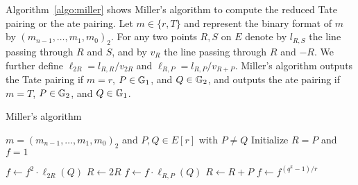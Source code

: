 
Algorithm~\ref{algo:miller} shows Miller's algorithm to compute the reduced Tate pairing or the ate pairing. 
Let $m \in \{r,T\}$ and represent the binary format of $m$ by $(m_{n-1},\dots,m_1,m_0)_2$.
For any two points $R,S$ on $E$ denote by $l_{R,S}$ the line passing through
$R$ and $S$, and by $v_R$ the line passing through $R$ and $-R$.
We further define $\ell_{2R} = l_{R,R}/v_{2R}$ and
$\ell_{R,P} = l_{R,P} / v_{R+P}$.
Miller's algorithm outputs the Tate pairing if $m = r$, $P \in \mathbb{G}_{1}$, and $Q \in \mathbb{G}_{2}$, and outputs the ate pairing if $m = T$, $P \in \mathbb{G}_{2}$, and $Q \in \mathbb{G}_{1}$.

\begin{algorithm}
\caption{Miller's algorithm}
\label{algo:miller}
\begin{algorithmic}[1]

	\Require $m = (m_{n-1}, \dots, m_1, m_0)_2$ and $P,Q \in E[r]$ with $P \ne Q$
	\State Initialize $R = P$ and $f = 1$

		\State $f \leftarrow f^2 \cdot \ell_{2R}(Q)$
		\State $R \leftarrow 2R$
			\State $f \leftarrow f \cdot \ell_{R,P}(Q)$
			\State $R \leftarrow R+P$
		\EndIf
	\EndFor
	\State $f \leftarrow f^{(q^k-1)/r}$

\end{algorithmic}
\end{algorithm}

